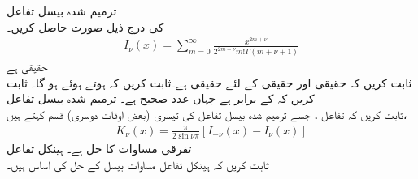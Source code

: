 \quad ترمیم شدہ بیسل تفاعل\\
 کی درج ذیل صورت حاصل کریں۔
\begin{align}
I_{\nu}(x)=\sum_{m=0}^{\infty}\frac{x^{2m+\nu}}{2^{2m+\nu}m!\Gamma(m+\nu+1)}
\end{align}
\quad {} حقیقی ہے\\
ثابت کریں کہ حقیقی  اور حقیقی  کے لئے  حقیقی ہے۔ثابت کریں کہ  ہوتے ہوئے  ہو گا۔ ثابت کریں کہ  کے برابر ہے جہاں  عدد صحیح ہے۔
\quad ترمیم شدہ بیسل تفاعل\\
ثابت کریں کہ تفاعل ، جسے ترمیم شدہ بیسل تفاعل کی تیسری (بعض اوقات دوسری) قسم کہتے ہیں،
\begin{align}
K_{\nu}(x)=\frac{\pi}{2\sin \nu\pi}[I_{-\nu}(x)-I_{\nu}(x)]
\end{align}
تفرقی مساوات  کا حل ہے۔ 
\quad ہینکل تفاعل\\
ثابت کریں کہ ہینکل تفاعل  مساوات بیسل کے حل کی اساس ہیں۔ 

